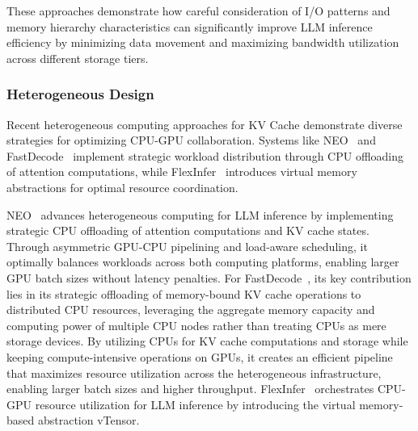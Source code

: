 These approaches demonstrate how careful consideration of I/O patterns and memory hierarchy characteristics can significantly improve LLM inference efficiency by minimizing data movement and maximizing bandwidth utilization across different storage tiers.


\subsubsection{Heterogeneous Design}\label{sec:sys_hd_heter}

Recent heterogeneous computing approaches for KV Cache demonstrate diverse strategies for optimizing CPU-GPU collaboration. Systems like NEO~\cite{jiang2024neosavinggpumemory} and FastDecode~\cite{he2024fastdecodehighthroughputgpuefficientllm} implement strategic workload distribution through CPU offloading of attention computations, while FlexInfer~\cite{xu2024vtensorflexiblevirtualtensor} introduces virtual memory abstractions for optimal resource coordination. 

NEO~\cite{jiang2024neosavinggpumemory} advances heterogeneous computing for LLM inference by implementing strategic CPU offloading of attention computations and KV cache states. Through asymmetric GPU-CPU pipelining and load-aware scheduling, it optimally balances workloads across both computing platforms, enabling larger GPU batch sizes without latency penalties. 
For FastDecode~\cite{he2024fastdecodehighthroughputgpuefficientllm}, its key contribution lies in its strategic offloading of memory-bound KV cache operations to distributed CPU resources, leveraging the aggregate memory capacity and computing power of multiple CPU nodes rather than treating CPUs as mere storage devices. By utilizing CPUs for KV cache computations and storage while keeping compute-intensive operations on GPUs, it creates an efficient pipeline that maximizes resource utilization across the heterogeneous infrastructure, enabling larger batch sizes and higher throughput.
FlexInfer~\cite{xu2024vtensorflexiblevirtualtensor} orchestrates CPU-GPU resource utilization for LLM inference by introducing the virtual memory-based abstraction vTensor. 


